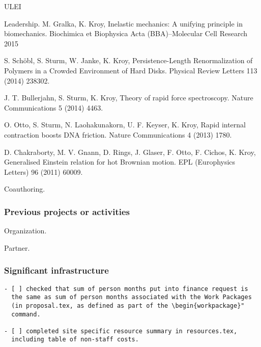 \begin{sitedescription}{ULEI}
\begin{compactenum}
\item Leadership.
M. Gralka, K. Kroy, Inelastic mechanics: A unifying principle in biomechanics. 
Biochimica et Biophysica Acta (BBA)--Molecular Cell Research 2015

S. Schöbl, S. Sturm, W. Janke, K. Kroy, Persistence-Length Renormalization of Polymers in a Crowded Environment of Hard Disks.
Physical Review Letters 113 (2014) 238302.

J. T. Bullerjahn, S. Sturm, K. Kroy, Theory of rapid force spectroscopy. Nature Communications 5 (2014) 4463.

O. Otto, S. Sturm, N. Laohakunakorn, U. F. Keyser, K. Kroy, Rapid internal contraction boosts DNA friction.
Nature Communications 4 (2013) 1780.

D. Chakraborty, M. V. Gnann, D. Rings, J. Glaser, F. Otto, F. Cichos, K. Kroy, 
Generalised Einstein relation for hot Brownian motion. EPL (Europhysics Letters) 96 (2011) 60009.

\item Coauthoring.
\end{compactenum}

\subsubsection*{Previous projects or activities}

\begin{compactenum}
\item Organization.
\item Partner.
\end{compactenum}

\subsubsection*{Significant infrastructure}


\end{sitedescription}

\begin{draft}
\vspace{1cm}

\begin{verbatim}
- [ ] checked that sum of person months put into finance request is
  the same as sum of person months associated with the Work Packages
  (in proposal.tex, as defined as part of the \begin{workpackage}"
  command.
  
- [ ] completed site specific resource summary in resources.tex,
  including table of non-staff costs.

\end{verbatim}
\end{draft}

